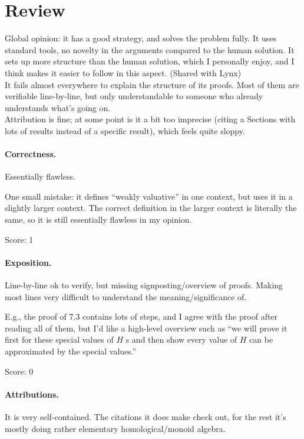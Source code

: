 \documentclass[11pt]{article}
\theoremstyle{definition}
\theoremstyle{remark}
\begin{document}
\maketitle

\section{Review}

Global opinion: it has a good strategy, and solves the problem fully. It uses standard tools, no novelty in the arguments compared to the human solution. It sets up more structure than the human solution, which I personally enjoy, and I think makes it easier to follow in this aspect. (Shared with Lynx) \\
It fails almost everywhere to explain the structure of its proofs. Most of them are verifiable line-by-line, but only understandable to someone who already understands what's going on.\\
Attribution is fine; at some point is it a bit too imprecise (citing a Sections with lots of results instead of a specific result), which feels quite sloppy.


\paragraph{Correctness.}
Essentially flawless.

One small mistake: it defines ``weakly valuative'' in one context, but uses it in a slightly larger context. The correct definition in the larger context is literally the same, so it is still essentially flawless in my opinion.

\noindent Score: 1

\paragraph{Exposition.}
Line-by-line ok to verify, but missing signposting/overview of proofs. Making most lines very difficult to understand the meaning/significance of.

E.g., the proof of 7.3 contains lots of steps, and I agree with the proof after reading all of them, but I'd like a high-level overview such as ``we will prove it first for these special values of $H$ s and then show every value of $H$ can be approximated by the special values.''

\noindent Score: 0

\paragraph{Attributions.}
It is very self-contained. The citations it does make check out, for the rest it's mostly doing rather elementary homological/monoid algebra.
\end{document}
